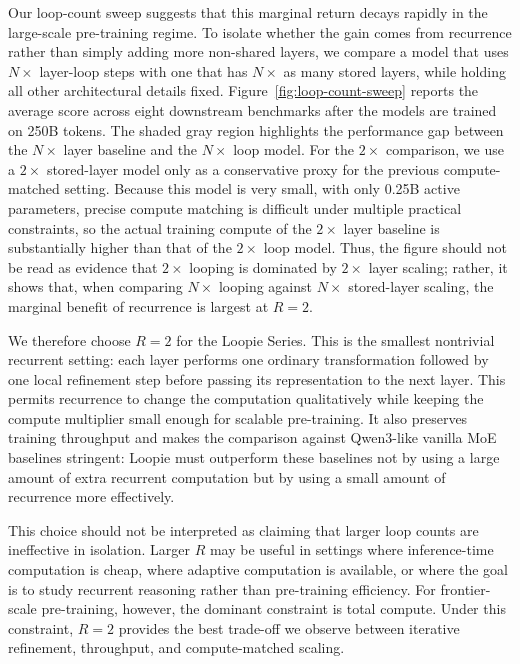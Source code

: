 Our loop-count sweep suggests that this marginal return decays rapidly in the large-scale pre-training regime. To isolate whether the gain comes from recurrence rather than simply adding more non-shared layers, we compare a model that uses $N\times$ layer-loop steps with one that has $N\times$ as many stored layers, while holding all other architectural details fixed. Figure~\ref{fig:loop-count-sweep} reports the average score across eight downstream benchmarks after the models are trained on 250B tokens. The shaded gray region highlights the performance gap between the $N\times$ layer baseline and the $N\times$ loop model. For the $2\times$ comparison, we use a $2\times$ stored-layer model only as a conservative proxy for the previous compute-matched setting. Because this model is very small, with only 0.25B active parameters, precise compute matching is difficult under multiple practical constraints, so the actual training compute of the $2\times$ layer baseline is substantially higher than that of the $2\times$ loop model. Thus, the figure should not be read as evidence that $2\times$ looping is dominated by $2\times$ layer scaling; rather, it shows that, when comparing $N\times$ looping against $N\times$ stored-layer scaling, the marginal benefit of recurrence is largest at $R=2$.

We therefore choose $R=2$ for the Loopie Series. This is the smallest nontrivial recurrent setting: each layer performs one ordinary transformation followed by one local refinement step before passing its representation to the next layer. This permits recurrence to change the computation qualitatively while keeping the compute multiplier small enough for scalable pre-training. It also preserves training throughput and makes the comparison against Qwen3-like vanilla MoE baselines stringent: Loopie must outperform these baselines not by using a large amount of extra recurrent computation but by using a small amount of recurrence more effectively.

This choice should not be interpreted as claiming that larger loop counts are ineffective in isolation. Larger $R$ may be useful in settings where inference-time computation is cheap, where adaptive computation is available, or where the goal is to study recurrent reasoning rather than pre-training efficiency. For frontier-scale pre-training, however, the dominant constraint is total compute. Under this constraint, $R=2$ provides the best trade-off we observe between iterative refinement, throughput, and compute-matched scaling.
